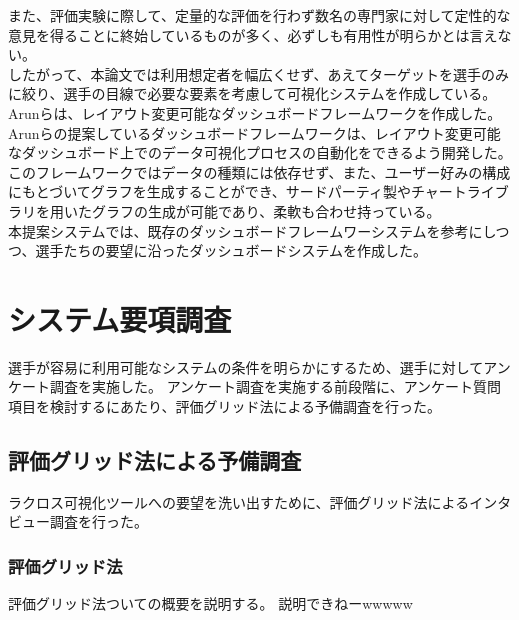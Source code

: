 \documentclass[sotsuron]{kuee}
\begin{document}
また、評価実験に際して、定量的な評価を行わず数名の専門家に対して定性的な意見を得ることに終始しているものが多く、必ずしも有用性が明らかとは言えない。
\\したがって、本論文では利用想定者を幅広くせず、あえてターゲットを選手のみに絞り、選手の目線で必要な要素を考慮して可視化システムを作成している。
\\Arunらは、レイアウト変更可能なダッシュボードフレームワークを作成した。
Arunらの提案しているダッシュボードフレームワークは、レイアウト変更可能なダッシュボード上でのデータ可視化プロセスの自動化をできるよう開発した。
このフレームワークではデータの種類には依存せず、また、ユーザー好みの構成にもとづいてグラフを生成することができ、サードパーティ製やチャートライブラリを用いたグラフの生成が可能であり、柔軟も合わせ持っている。
\\本提案システムでは、既存のダッシュボードフレームワーシステムを参考にしつつ、選手たちの要望に沿ったダッシュボードシステムを作成した。


\chapter{システム要項調査}
選手が容易に利用可能なシステムの条件を明らかにするため、選手に対してアンケート調査を実施した。
アンケート調査を実施する前段階に、アンケート質問項目を検討するにあたり、評価グリッド法による予備調査を行った。
\section{評価グリッド法による予備調査}
ラクロス可視化ツールへの要望を洗い出すために、評価グリッド法によるインタビュー調査を行った。
\subsection{評価グリッド法}
評価グリッド法ついての概要を説明する。
説明できねーwwwww
\end{document}

